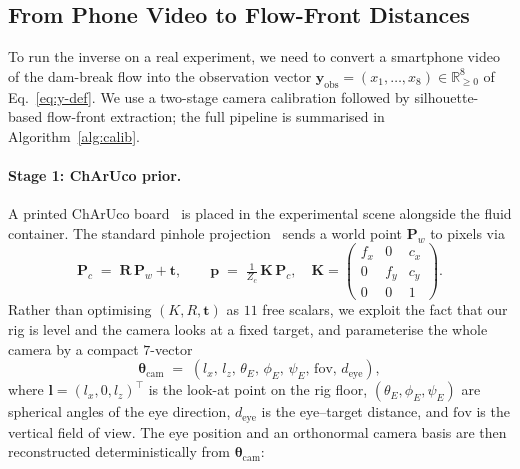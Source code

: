 \subsection{From Phone Video to Flow-Front Distances}
\label{sec:calib}

To run the inverse on a real experiment, we need to convert a
smartphone video of the dam-break flow into the observation vector
$\mathbf{y}_{\mathrm{obs}} = (x_{1}, \dots, x_{8}) \in
\mathbb{R}_{\ge 0}^{8}$ of Eq.~\eqref{eq:y-def}. We use a two-stage
camera calibration followed by silhouette-based flow-front
extraction; the full pipeline is summarised in
Algorithm~\ref{alg:calib}.

\paragraph{Stage 1: ChArUco prior.}
A printed ChArUco
board~\cite{garrido2014automatic,garrido2016generation} is placed in
the experimental scene alongside the fluid container. The standard
pinhole projection~\cite{hartley2004multiple} sends a world point
$\mathbf{P}_{w}$ to pixels via
\begin{equation}
\label{eq:pinhole}
    \mathbf{P}_{c} \;=\; \mathbf{R}\,\mathbf{P}_{w} + \mathbf{t},
    \qquad
    \mathbf{p} \;=\; \tfrac{1}{Z_{c}}\,\mathbf{K}\,\mathbf{P}_{c},
    \quad
    \mathbf{K} = \begin{pmatrix}
          f_{x} & 0     & c_{x} \\
          0     & f_{y} & c_{y} \\
          0     & 0     & 1
        \end{pmatrix}.
\end{equation}
Rather than optimising $(K, R, \mathbf{t})$ as $11$ free scalars, we
exploit the fact that our rig is level and the camera looks at a
fixed target, and parameterise the whole camera by a compact
$7$-vector
\begin{equation}
\label{eq:theta-cam}
    \boldsymbol{\theta}_{\mathrm{cam}}
    \;=\;
    (l_{x},\,l_{z},\,\theta_{E},\,\phi_{E},\,\psi_{E},\,
    \mathrm{fov},\,d_{\mathrm{eye}}),
\end{equation}
where $\mathbf{l} = (l_{x}, 0, l_{z})^{\!\top}$ is the look-at point
on the rig floor, $(\theta_{E}, \phi_{E}, \psi_{E})$ are spherical
angles of the eye direction, $d_{\mathrm{eye}}$ is the eye--target
distance, and $\mathrm{fov}$ is the vertical field of view. The eye position and
an orthonormal camera basis are then reconstructed deterministically
from $\boldsymbol{\theta}_{\mathrm{cam}}$:
